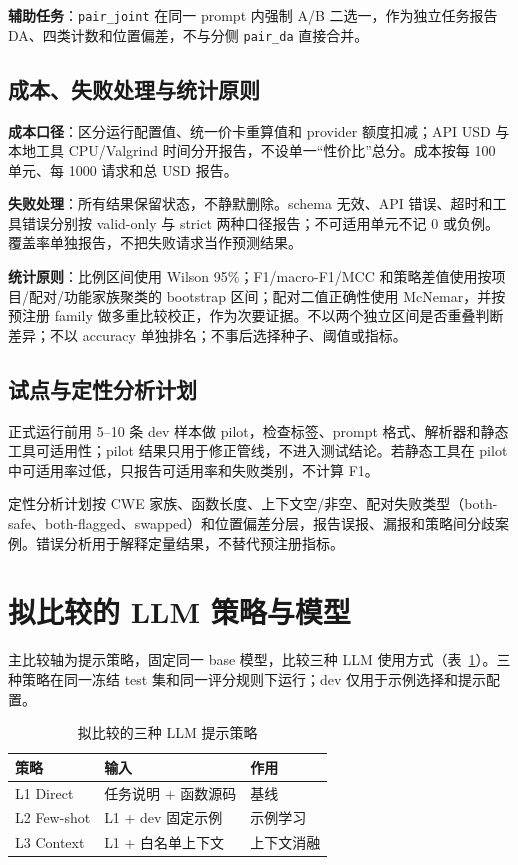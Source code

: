 \documentclass[conference]{IEEEtran}
\begin{document}
\textbf{辅助任务}：\texttt{pair\_joint} 在同一 prompt 内强制 A/B 二选一，作为独立任务报告 DA、四类计数和位置偏差，不与分侧 \texttt{pair\_da} 直接合并。

\subsection{成本、失败处理与统计原则}
\label{sec:eval-cost}

\textbf{成本口径}：区分运行配置值、统一价卡重算值和 provider 额度扣减；API USD 与本地工具 CPU/Valgrind 时间分开报告，不设单一“性价比”总分。成本按每 100 单元、每 1000 请求和总 USD 报告。

\textbf{失败处理}：所有结果保留状态，不静默删除。schema 无效、API 错误、超时和工具错误分别按 valid-only 与 strict 两种口径报告；不可适用单元不记 0 或负例。覆盖率单独报告，不把失败请求当作预测结果。

\textbf{统计原则}：比例区间使用 Wilson 95\%；F1/macro-F1/MCC 和策略差值使用按项目/配对/功能家族聚类的 bootstrap 区间；配对二值正确性使用 McNemar，并按预注册 family 做多重比较校正，作为次要证据。不以两个独立区间是否重叠判断差异；不以 accuracy 单独排名；不事后选择种子、阈值或指标。

\subsection{试点与定性分析计划}
\label{sec:eval-pilot}

正式运行前用 5--10 条 dev 样本做 pilot，检查标签、prompt 格式、解析器和静态工具可适用性；pilot 结果只用于修正管线，不进入测试结论。若静态工具在 pilot 中可适用率过低，只报告可适用率和失败类别，不计算 F1。

定性分析计划按 CWE 家族、函数长度、上下文空/非空、配对失败类型（both-safe、both-flagged、swapped）和位置偏差分层，报告误报、漏报和策略间分歧案例。错误分析用于解释定量结果，不替代预注册指标。


\section{拟比较的 LLM 策略与模型}
\label{sec:approaches}

主比较轴为提示策略，固定同一 base 模型，比较三种 LLM 使用方式（表~\ref{tab:approaches}）。三种策略在同一冻结 test 集和同一评分规则下运行；dev 仅用于示例选择和提示配置。

\begin{table}[t]
\caption{拟比较的三种 LLM 提示策略}
\label{tab:approaches}
\centering
\small
\begin{tabular}{@{}lll@{}}
\toprule
策略 & 输入 & 作用\\
\midrule
L1 Direct & 任务说明 + 函数源码 & 基线\\
L2 Few-shot & L1 + dev 固定示例 & 示例学习\\
L3 Context & L1 + 白名单上下文 & 上下文消融\\
\bottomrule
\end{tabular}
\end{table}
\end{document}
